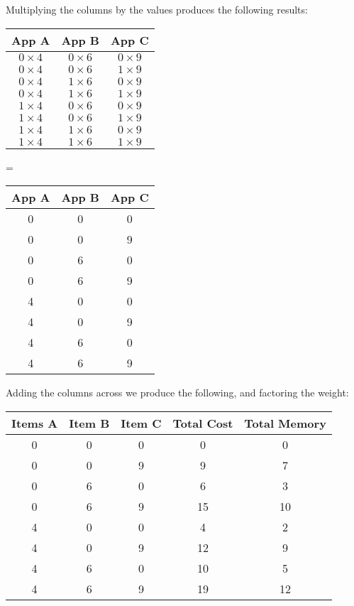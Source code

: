 \documentclass{article}
\begin{document}
Multiplying the columns by the values produces the following results:

\begin{center}

    \begin{tabular}{|c|c|c|}
        \hline
        App A & App B & App C   \\ \hline
        $0 \times 4$ & $0 \times 6$ & $0 \times 9$ \\
        $0 \times 4$ & $0 \times 6$ & $1 \times 9$ \\
        $0 \times 4$ & $1 \times 6$ & $0 \times 9$ \\
        $0 \times 4$ & $1 \times 6$ & $1 \times 9$ \\
        $1 \times 4$ & $0 \times 6$ & $0 \times 9$ \\
        $1 \times 4$ & $0 \times 6$ & $1 \times 9$ \\
        $1 \times 4$ & $1 \times 6$ & $0 \times 9$ \\
        $1 \times 4$ & $1 \times 6$ & $1 \times 9$ \\
        \hline
    \end{tabular} \quad
    = \quad
    \begin{tabular}{|c|c|c|}
        \hline
        App A & App B & App C \\ \hline
        0 & 0 & 0\\
        0 & 0 & 9\\
        0 & 6 & 0\\
        0 & 6 & 9\\
        4 & 0 & 0\\
        4 & 0 & 9\\
        4 & 6 & 0\\
        4 & 6 & 9\\
        \hline
    \end{tabular}
\end{center}

Adding the columns across we produce the following, and factoring the weight:
\begin{center}
    \begin{tabular}{|c|c|c|c|c|}
        \hline
        Items A & Item B & Item C & Total Cost & Total Memory \\ \hline
        0 & 0 & 0 & 0 & 0\\
        0 & 0 & 9 & 9 & 7\\
        0 & 6 & 0 & 6 & 3\\
        0 & 6 & 9 & 15 & 10\\
        4 & 0 & 0 & 4 & 2\\
        4 & 0 & 9 & 12 & 9\\
        4 & 6 & 0 & 10 & 5\\
        4 & 6 & 9 & 19 & 12\\
        \hline
    \end{tabular}
\end{center}
\end{document}
